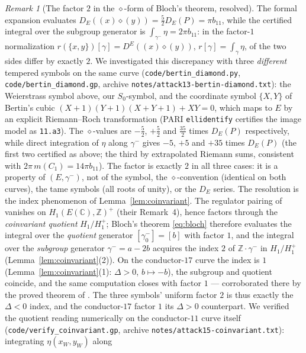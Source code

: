 \documentclass[11pt]{amsart}
\theoremstyle{definition}
\theoremstyle{remark}
\newtheorem{remark}[theorem]{Remark}
\newcommand{\Z}{\mathbb{Z}}
\newcommand{\C}{\mathbb{C}}
\begin{document}
\begin{remark}[The factor $2$ in the $\diamond$-form of Bloch's theorem,
resolved]\label{rem:diamondk0}
The formal expansion evaluates
$D_E((x)\diamond(y))=\frac52D_E(P)=\pi b_{11}$, while the certified integral
over the subgroup generator is $\int_{\gamma^-}\eta=2\pi b_{11}$: in the
factor-$1$ normalization $r(\{x,y\})[\gamma]=D^E((x)\diamond(y))$,
$r[\gamma]=\int_\gamma\eta$, of \cite[Thm.~6]{LalinRam} the two sides differ
by exactly $2$. We investigated this discrepancy with three \emph{different}
tempered symbols on the same curve (\texttt{code/bertin\_diamond.py},
\texttt{code/bertin\_diamond.gp}, archive
\texttt{notes/attack13-bertin-diamond.txt}): the Weierstrass symbol above,
our $S_0$-symbol, and the coordinate symbol $\{X,Y\}$ of Bertin's cubic
$(X+1)(Y+1)(X+Y+1)+XY=0$, which maps to $E$ by an explicit Riemann--Roch
transformation (PARI \texttt{ellidentify} certifies the image model as
\texttt{11.a3}). The $\diamond$-values are $-\frac52$, $+\frac52$ and
$\frac{35}{2}$ times $D_E(P)$ respectively, while direct integration of
$\eta$ along $\gamma^-$ gives $-5$, $+5$ and $+35$ times $D_E(P)$ (the first
two certified as above; the third by extrapolated Riemann sums, consistent
with $2\pi\,m(C_1)=14\pi b_{11}$). The factor is exactly $2$ in all three
cases: it is a property of $(E,\gamma^-)$, not of the symbol, the
$\diamond$-convention (identical on both curves), the tame symbols (all
roots of unity), or the $D_E$ series.
The resolution is the index phenomenon of Lemma~\ref{lem:coinvariant}. The
regulator pairing of \cite[Def.~3]{LalinRam} vanishes on $H_1(E(\C),\Z)^+$
(their Remark~4), hence factors through the \emph{coinvariant quotient}
$H_1/H_1^+$; Bloch's theorem \eqref{eq:bloch} therefore evaluates the
integral over the \emph{quotient} generator $[\gamma^-_0]=[b]$ with
factor $1$, and the integral over the \emph{subgroup} generator
$\gamma^-=a-2b$ acquires the index $2$ of $\Z\cdot\gamma^-$ in $H_1/H_1^+$
(Lemma~\ref{lem:coinvariant}(2)). On the conductor-$17$ curve the index is
$1$ (Lemma~\ref{lem:coinvariant}(1): $\Delta>0$, $b\mapsto-b$), the subgroup
and quotient coincide, and the same computation closes with factor $1$ ---
corroborated there by the proved theorem of \cite{LalinRam}. The three
symbols' uniform factor $2$ is thus exactly the $\Delta<0$ index, and the
conductor-$17$ factor $1$ its $\Delta>0$ counterpart.
We verified the quotient reading numerically on the conductor-$11$ curve
itself (\texttt{code/verify\_coinvariant.gp}, archive
\texttt{notes/attack15-coinvariant.txt}): integrating $\eta(x_W,y_W)$ along

\end{remark}
\end{document}
